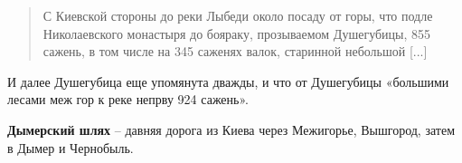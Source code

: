 \begin{quotation}
С Киевской стороны до реки Лыбеди около посаду от горы, что подле Николаевского монастыря до бояраку, прозываемом Душегубицы, 855 сажень, в том числе на 345 саженях валок, старинной небольшой [...]\end{quotation}

И далее Душегубица еще упомянута дважды, и что от Душегубицы «большими лесами меж гор к реке непрву 924 сажень».\\

\medskip

\textbf{Дымерский шлях} – давняя дорога из Киева через Межигорье, Вышгород, затем в Дымер и Чернобыль.

